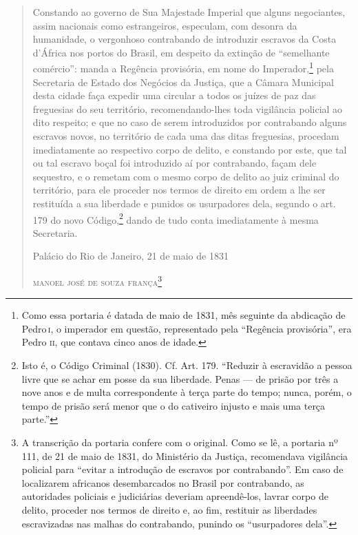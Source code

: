 \begin{quote}
Constando ao governo de Sua Majestade Imperial que alguns negociantes,
assim nacionais como estrangeiros, especulam, com desonra da humanidade,
o vergonhoso contrabando de introduzir escravos da Costa d'África nos
portos do Brasil, em despeito da extinção de ``semelhante comércio'':
manda a Regência provisória, em nome do Imperador,\footnote{Como essa
  portaria é datada de maio de 1831, mês seguinte da abdicação de Pedro\,\textsc{i}, o imperador em questão, representado pela ``Regência provisória'', era
  Pedro \textsc{ii}, que contava cinco anos de idade.} pela Secretaria de
Estado dos Negócios da Justiça, que a Câmara Municipal desta cidade faça
expedir uma circular a todos os juízes de paz das freguesias do seu
território, recomendando-lhes toda vigilância policial ao dito respeito;
e que no caso de serem introduzidos por contrabando alguns escravos
novos, no território de cada uma das ditas freguesias, procedam
imediatamente ao respectivo corpo de delito, e constando por este, que
tal ou tal escravo boçal foi introduzido aí por contrabando, façam dele
sequestro, e o remetam com o mesmo corpo de delito ao juiz criminal do
território, para ele proceder nos termos de direito em ordem a lhe ser
restituída a sua liberdade e punidos os usurpadores dela, segundo o art.
179 do novo Código,\footnote{Isto é, o Código Criminal (1830). Cf. Art.
  179. ``Reduzir à escravidão a pessoa livre que se achar em posse da sua
  liberdade. Penas --- de prisão por três a nove anos e de multa
  correspondente à terça parte do tempo; nunca, porém, o tempo de prisão
  será menor que o do cativeiro injusto e mais uma terça parte.''} dando
de tudo conta imediatamente à mesma Secretaria.

\medskip

\hfill{} Palácio do Rio de Janeiro, 21 de maio de 1831

\hfill\textsc{manoel josé de souza frança}\footnote{A transcrição da portaria
  confere com o original. Como se lê, a portaria nº 111, de 21 de maio de 1831,
  do Ministério da Justiça, recomendava vigilância policial para ``evitar
  a introdução de escravos por contrabando''. Em caso de localizarem
  africanos desembarcados no Brasil por contrabando, as autoridades
  policiais e judiciárias deveriam apreendê-los, lavrar corpo de
  delito, proceder nos termos de direito e, ao fim, restituir as
  liberdades escravizadas nas malhas do contrabando, punindo os
  ``usurpadores dela''.}
\end{quote}

